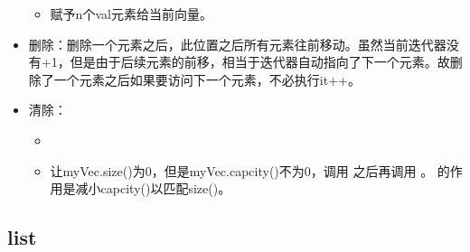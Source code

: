 \documentclass[letterpaper,10pt,english]{sphinxmanual}
\begin{document}
\begin{itemize}
\begin{itemize}
\item {} 
赋予n个val元素给当前向量。

%
\begin{sphinxVerbatim}[commandchars=\\\{\}]
      
\end{sphinxVerbatim}

\end{itemize}

\item {} 
删除：删除一个元素之后，此位置之后所有元素往前移动。虽然当前迭代器没有+1，但是由于后续元素的前移，相当于迭代器自动指向了下一个元素。故删除了一个元素之后如果要访问下一个元素，不必执行it++。

%
\begin{sphinxVerbatim}[commandchars=\\\{\}]
   
      \PYG{c+c1}{// 区间 [first,last)}
\end{sphinxVerbatim}

\item {} 
清除：
\begin{itemize}
\item {} 

\item {} 
 让myVec.size()为0，但是myVec.capcity()不为0，调用  之后再调用  。  的作用是减小capcity()以匹配size()。

\end{itemize}

\end{itemize}


\subsection{list}
\label{\detokenize{cpp/19_stl:list}}
%
\begin{sphinxVerbatim}[commandchars=\\\{\}]
\end{sphinxVerbatim}
\end{document}
